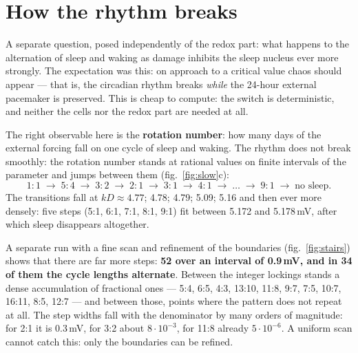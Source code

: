 \section{How the rhythm breaks}\label{sec:bifur}
A separate question, posed independently of the redox part: what happens to the alternation of sleep and waking as damage inhibits the sleep nucleus ever more strongly. The expectation was this: on approach to a critical value chaos should appear --- that is, the circadian rhythm breaks \emph{while} the 24-hour external pacemaker is preserved. This is cheap to compute: the switch is deterministic, and neither the cells nor the redox part are needed at all.

The right observable here is the \textbf{rotation number}: how many days of the external forcing fall on one cycle of sleep and waking. The rhythm does not break smoothly: the rotation number stands at rational values on finite intervals of the parameter and jumps between them (fig.~\ref{fig:slow}c):
\[1\!:\!1\;\to\;5\!:\!4\;\to\;3\!:\!2\;\to\;2\!:\!1\;\to\;3\!:\!1\;\to\;4\!:\!1\;\to\;\dots\;\to\;9\!:\!1\;\to\;\text{no sleep}.\]
The transitions fall at $kD\approx4.77$; 4.78; 4.79; 5.09; 5.16 and then ever more densely: five steps (5:1, 6:1, 7:1, 8:1, 9:1) fit between 5.172 and 5.178\,mV, after which sleep disappears altogether.

A separate run with a fine scan and refinement of the boundaries (fig.~\ref{fig:stairs}) shows that there are far more steps: \textbf{52 over an interval of 0.9\,mV, and in 34 of them the cycle lengths alternate}. Between the integer lockings stands a dense accumulation of fractional ones --- 5:4, 6:5, 4:3, 13:10, 11:8, 9:7, 7:5, 10:7, 16:11, 8:5, 12:7 --- and between those, points where the pattern does not repeat at all. The step widths fall with the denominator by many orders of magnitude: for 2:1 it is 0.3\,mV, for 3:2 about $8\cdot10^{-3}$, for 11:8 already $5\cdot10^{-6}$. A uniform scan cannot catch this: only the boundaries can be refined.


